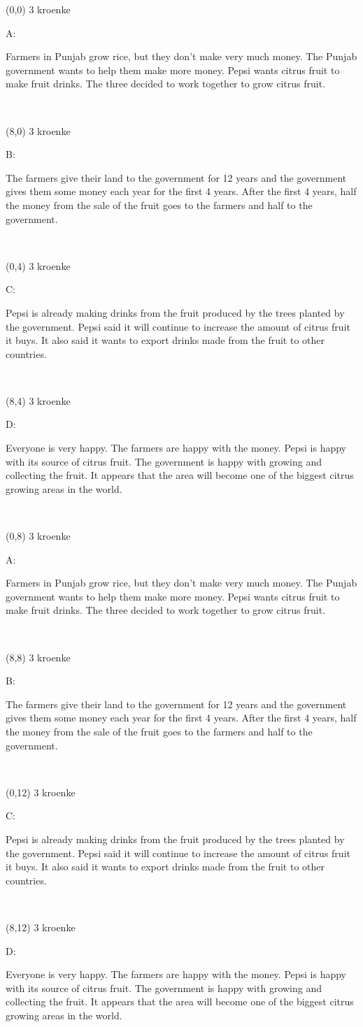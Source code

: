 \documentclass[a4paper]{article}
\newcommand{\myAcontent}[0]{
Farmers in Punjab grow rice, but they don't make very much money. The Punjab government wants to help them make more money. Pepsi wants citrus fruit to make fruit drinks. The three decided to work together to grow citrus fruit.
}
\newcommand{\myBcontent}[0]{
The farmers give their land to the government for 12 years and the government gives them some money each year for the first 4 years. After the first 4 years, half the money from the sale of the fruit goes to the farmers and half to the government.
}
\newcommand{\myCcontent}[0]{
Pepsi is already making drinks from the fruit produced by the trees planted by the government. Pepsi said it will continue to increase the amount of citrus fruit it buys. It also said it wants to export drinks made from the fruit to other countries.
}
\newcommand{\myDcontent}[0]{
Everyone is very happy. The farmers are happy with the money. Pepsi is happy with its source of citrus fruit. The government is happy with growing and collecting the fruit. It appears that the area will become one of the biggest citrus growing areas in the world.
}
\newcommand{\mycard}[5]{%
	\vspace{0.1cm}
	\small #1 #2
	\par
	\parbox[t][6.7cm][c]{9.5cm}{%
	\hspace{0.1cm} \Large#3\\
	\normalsize#4 #5
	}
}
\begin{document}
\selectfont

\begin{textblock}{8}(0,0)
\mycard{3}{kroenke}{\parbox{9.0cm}{A:
\myAcontent
}}{}{} 
\end{textblock}

\begin{textblock}{8}(8,0)
\mycard{3}{kroenke}{\parbox{9.0cm}{B:
\myBcontent
}}{}{} 
\end{textblock}

\begin{textblock}{8}(0,4)
\mycard{3}{kroenke}{\parbox{9.0cm}{C:
\myCcontent
}}{}{} 
\end{textblock}

\begin{textblock}{8}(8,4)
\mycard{3}{kroenke}{\parbox{9.0cm}{D:
\myDcontent
}}{}{} 
\end{textblock}

\begin{textblock}{8}(0,8)
\mycard{3}{kroenke}{\parbox{9.0cm}{A:
\myAcontent
}}{}{} 
\end{textblock}

\begin{textblock}{8}(8,8)
\mycard{3}{kroenke}{\parbox{9.0cm}{B:
\myBcontent
}}{}{} 
\end{textblock}

\begin{textblock}{8}(0,12)
\mycard{3}{kroenke}{\parbox{9.0cm}{C:
\myCcontent
}}{}{} 
\end{textblock}

\begin{textblock}{8}(8,12)
\mycard{3}{kroenke}{\parbox{9.0cm}{D:
\myDcontent
}}{}{} 
\end{textblock}
\end{document}
